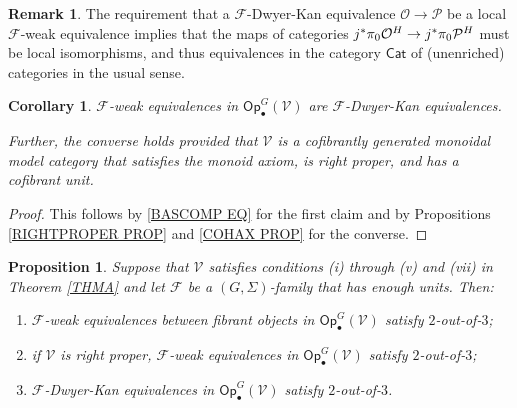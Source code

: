 \documentclass[a4paper,10pt
 ,final
]{article}%
\numberwithin{equation}{section}
\numberwithin{figure}{section}
\newtheorem{proposition}[equation]{Proposition}%
\newtheorem{corollary}[equation]{Corollary}%
\theoremstyle{definition} %
\newtheorem{remark}[equation]{Remark}%
\newcommand{\F}{\ensuremath{\mathcal F}}
\newcommand{\V}{\ensuremath{\mathcal V}}
\renewcommand{\O}{\ensuremath{\mathcal O}}
\renewcommand{\P}{\ensuremath{\mathcal P}}
\newcommand{\1}{\ensuremath{\mathbbm 1}}%
\begin{document}
\begin{remark}\label{CATEQUIV REM}
The requirement that 
a $\F$-Dwyer-Kan equivalence $\O \to \P$
be a local $\F$-weak equivalence
implies that the maps of categories 
$j^{\**}\pi_0 \O^H \to j^{\**}\pi_0 \P^H$
must be local isomorphisms, 
and thus equivalences in the category $\mathsf{Cat}$
of (unenriched) categories in the usual sense.
\end{remark}



\begin{corollary}\label{WEDKEQ COR}
$\F$-weak equivalences in $\mathsf{Op}^G_\bullet(\V)$
are $\F$-Dwyer-Kan equivalences.
	
Further, the converse holds provided that
$\V$ is a cofibrantly generated monoidal model category
that satisfies the monoid axiom, is right proper,
and has a cofibrant unit.	
\end{corollary}

\begin{proof}
	This follows by \eqref{BASCOMP EQ} for the first claim
	and by Propositions \ref{RIGHTPROPER PROP} and \ref{COHAX PROP}
	for the converse.
\end{proof}






\begin{proposition}\label{2OUTOF3 PROP}
Suppose that $\V$ satisfies conditions
(i) through (v) and (vii) in Theorem \ref{THMA} and 
let $\F$ be a $(G,\Sigma)$-family that has enough units. 
Then:
\begin{enumerate}[label=(\roman*)]
\item $\F$-weak equivalences between fibrant objects in $\mathsf{Op}^G_\bullet(\V)$
satisfy $2$-out-of-$3$;
\item if $\V$ is right proper, $\F$-weak equivalences in $\mathsf{Op}^G_\bullet(\V)$
satisfy $2$-out-of-$3$;
\item $\F$-Dwyer-Kan equivalences in $\mathsf{Op}^G_\bullet(\V)$
satisfy $2$-out-of-$3$.
\end{enumerate}
\end{proposition}
\end{document}
